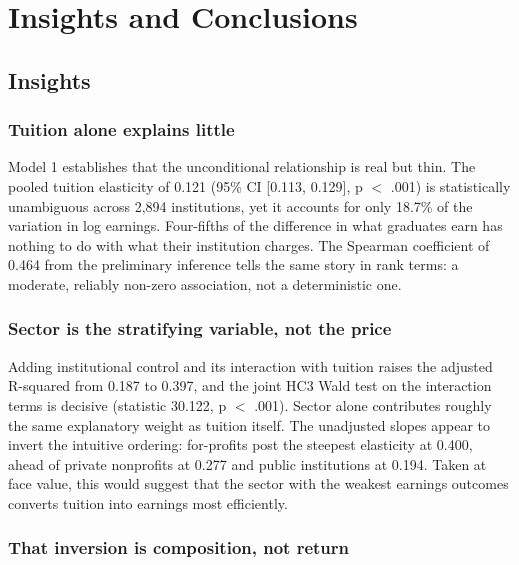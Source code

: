 \section{Insights and Conclusions}

\subsection{Insights}

\subsubsection*{Tuition alone explains little}

Model 1 establishes that the unconditional relationship is real but thin. The pooled tuition elasticity of 0.121 (95\% CI [0.113, 0.129], p $<$ .001) is statistically unambiguous across 2,894 institutions, yet it accounts for only 18.7\% of the variation in log earnings. Four-fifths of the difference in what graduates earn has nothing to do with what their institution charges. The Spearman coefficient of 0.464 from the preliminary inference tells the same story in rank terms: a moderate, reliably non-zero association, not a deterministic one.

\subsubsection*{Sector is the stratifying variable, not the price}

Adding institutional control and its interaction with tuition raises the adjusted R-squared from 0.187 to 0.397, and the joint HC3 Wald test on the interaction terms is decisive (statistic 30.122, p $<$ .001). Sector alone contributes roughly the same explanatory weight as tuition itself. The unadjusted slopes appear to invert the intuitive ordering: for-profits post the steepest elasticity at 0.400, ahead of private nonprofits at 0.277 and public institutions at 0.194. Taken at face value, this would suggest that the sector with the weakest earnings outcomes converts tuition into earnings most efficiently.

\subsubsection*{That inversion is composition, not return}


